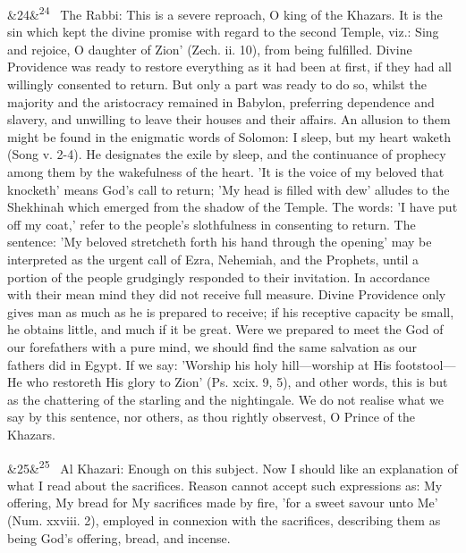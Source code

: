 \documentclass[12pt]{article}
\newcommand{\para}[1][]{\par\noindent\ifx&#1&\else\textsuperscript{\footnotesize #1}~\fi}
\begin{document}
\para[24] The Rabbi: This is a severe reproach, O king of the Khazars. It is the sin which kept the divine promise with regard to the second Temple, viz.: Sing and rejoice, O daughter of Zion' (Zech. ii. 10), from being fulfilled. Divine Providence was ready to restore everything as it had been at first, if they had all willingly consented to return. But only a part was ready to do so, whilst the majority and the aristocracy remained in Babylon, preferring dependence and slavery, and unwilling to leave their houses and their affairs. An allusion to them might be found in the enigmatic words of Solomon: I sleep, but my heart waketh (Song v. 2-4). He designates the exile by sleep, and the continuance of prophecy among them by the wakefulness of the heart. 'It is the voice of my beloved that knocketh' means God's call to return; 'My head is filled with dew' alludes to the Shekhinah which emerged from the shadow of the Temple. The words: 'I have put off my coat,' refer to the people's slothfulness in consenting to return. The sentence: 'My beloved stretcheth forth his hand through the opening' may be interpreted as the urgent call of Ezra, Nehemiah, and the Prophets, until a portion of the people grudgingly responded to their invitation. In accordance with their mean mind they did not receive full measure. Divine Providence only gives man as much as he is prepared to receive; if his receptive capacity be small, he obtains little, and much if it be great. Were we prepared to meet the God of our forefathers with a pure mind, we should find the same salvation as our fathers did in Egypt. If we say: 'Worship his holy hill---worship at His footstool---He who restoreth His glory to Zion' (Ps. xcix. 9, 5), and other words, this is but as the chattering of the starling and the nightingale. We do not realise what we say by this sentence, nor others, as thou rightly observest, O Prince of the Khazars.

\para[25] Al Khazari: Enough on this subject. Now I should like an explanation of what I read about the sacrifices. Reason cannot accept such expressions as: My offering, My bread for My sacrifices made by fire, 'for a sweet savour unto Me' (Num. xxviii. 2), employed in connexion with the sacrifices, describing them as being God's offering, bread, and incense.
\end{document}
